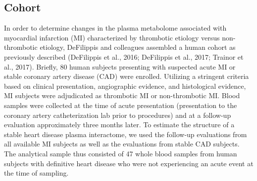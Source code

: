 \begin{DoubleSpace*}
\section{Cohort}

In order to determine changes in the plasma metabolome associated with myocardial infarction (MI) characterized by thrombotic etiology versus non-thrombotic etiology, DeFilippis and colleagues assembled a human cohort as previously described (DeFilippis et al., 2016; DeFilippis et al., 2017; Trainor et al., 2017). Briefly, 80 human subjects presenting with suspected acute MI or stable coronary artery disease (CAD) were enrolled. Utilizing a stringent criteria based on clinical presentation, angiographic evidence, and histological evidence, MI subjects were adjudicated as thrombotic MI or non-thrombotic MI. Blood samples were collected at the time of acute presentation (presentation to the coronary artery catheterization lab prior to procedures) and at a follow-up evaluation approximately three months later. To estimate the structure of a stable heart disease plasma interactome, we used the follow-up evaluations from all available MI subjects as well as the evaluations from stable CAD subjects. The analytical sample thus consisted of 47 whole blood samples from human subjects with definitive heart disease who were not experiencing an acute event at the time of sampling. 


\end{DoubleSpace*}
